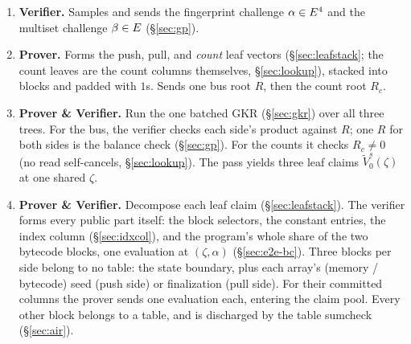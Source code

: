\begin{enumerate}
\item \textbf{Verifier.} Samples and sends the fingerprint challenge $\alpha\in E^{4}$ and the multiset challenge $\beta\in E$ (\S\ref{sec:gp}).
\item \textbf{Prover.} Forms the push, pull, and \emph{count} leaf vectors (\S\ref{sec:leafstack}; the count leaves are the count columns themselves, \S\ref{sec:lookup}), stacked into blocks and padded with $1$s. Sends one bus root $R$, then the count root $R_c$.
\item \textbf{Prover \& Verifier.} Run the one batched GKR (\S\ref{sec:gkr}) over all three trees. For the bus, the verifier checks each side's product against $R$; one $R$ for both sides is the balance check (\S\ref{sec:gp}). For the counts it checks $R_c\neq0$ (no read self-cancels, \S\ref{sec:lookup}). The pass yields three leaf claims $\widetilde V^{s}_0(\zeta)$ at one shared $\zeta$.
\item \textbf{Prover \& Verifier.} Decompose each leaf claim (\S\ref{sec:leafstack}). The verifier forms every public part itself: the block selectors, the constant entries, the index column (\S\ref{sec:idxcol}), and the program's whole share of the two bytecode blocks, one evaluation at $(\zeta,\alpha)$ (\S\ref{sec:e2e-bc}). Three blocks per side belong to no table: the state boundary, plus each array's (memory / bytecode) seed (push side) or finalization (pull side). For their committed columns the prover sends one evaluation each, entering the claim pool. Every other block belongs to a table, and is discharged by the table sumcheck (\S\ref{sec:air}).
\end{enumerate}

